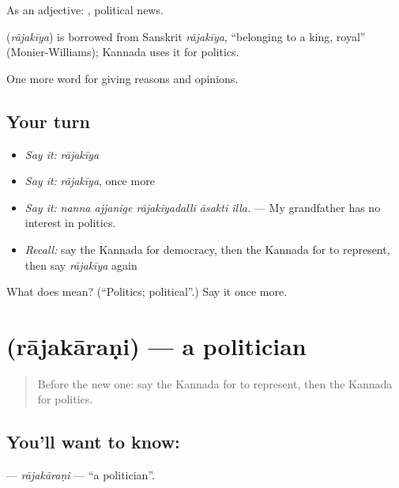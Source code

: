 As an adjective:  , political news.

\begin{cousinweb}
\textbf{} (\emph{rājakīya}) is borrowed from Sanskrit \emph{rājakīya}, \textquotedblleft{}belonging to a king, royal\textquotedblright{} (Monier-Williams); Kannada uses it for politics.
\end{cousinweb}

\begin{grammarlens}[title={What you've built}]
One more word for giving reasons and opinions.
\end{grammarlens}

\subsection*{Your turn}
\begin{itemize}
\raggedright
  \item \emph{Say it:} \emph{rājakīya}
  \item \emph{Say it:} \emph{rājakīya}, once more
  \item \emph{Say it:} \emph{nanna ajjanige rājakīyadalli āsakti illa.} — My grandfather has no interest in politics.
  \item \emph{Recall:} say the Kannada for democracy, then the Kannada for to represent, then say \emph{rājakīya} again
\end{itemize}

\begin{tcolorbox}[breakable,colback=teal!4,colframe=teal!35!black,title={Before you move on}]
What does  mean? (\textquotedblleft{}Politics; political\textquotedblright{}.) Say it once more.
\end{tcolorbox}
\section[\texorpdfstring{\kn{ರಾಜಕಾರಣಿ} (rājakāraṇi)}{ರಾಜಕಾರಣಿ (rājakāraṇi)}]{ (rājakāraṇi) — a politician}

\label{lesson:KA-C394-rajakarani}



\begin{quote}
Before the new one: say the Kannada for to represent, then the Kannada for politics.
\end{quote}

\subsection*{You'll want to know: }
\textbf{} — \emph{rājakāraṇi} — \textquotedblleft{}a politician\textquotedblright{}.

